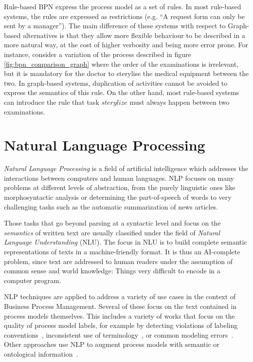 Rule-based BPN express the process model as a set of rules. In most rule-based
systems, the rules are expressed as restrictions (e.g. ``A request form can only
be sent by a manager''). The main difference of these systems with respect to
Graph-based alternatives is that they allow more flexible behaviour to be
described in a more natural way, at the cost of higher verbosity and being more
error prone. For instance, consider a variation of the process described in
figure \ref{fig:bpn_comparison_graph} where the order of the examinations is
irrelevant, but it is mandatory for the doctor to sterylise the medical
equipment between the two. In graph-based systems, duplication of activities
cannot be avoided to express the semantics of this rule. On the other hand, most
rule-based systems can introduce the rule that task $sterylize$ must always
happen between two examinations.

\section{Natural Language Processing}
\label{sec:background_nlp}

\emph{Natural Language Processing} is a field of artificial intelligence which
addresses the interactions between computers and human languages. NLP focuses on
many problems at different levels of abstraction, from the purely linguistic
ones like morphosyntactic analysis or determining the part-of-speech of words
to very challenging tasks such as the automatic summarization of news articles.

Those tasks that go beyond parsing at a syntactic level and focus on the
\emph{semantics} of written text are usually classified under the field of
\emph{Natural Language Understanding} (NLU). The focus in NLU is to build
complete semantic representations of texts in a machine-friendly format. It is
thus an AI-complete\cite{22, section 1 from TFM} problem, since text are
addressed to human readers under the assumption of common sense and world
knowledge: Things very difficult to encode in a computer program. 

NLP techniques are applied to address a variety of use cases in the context of
Business Process Management. Several of these focus on the text contained in
process models themselves. This includes a variety of works that focus on the
quality of process model labels, for example by detecting violations of labeling
conventions~\cite{becker2009,leopold2013detection,vandervos1997verification},
inconsistent use of terminology~\cite{koschmider2007}, or common modeling
errors~\cite{gruhn2011detecting}. Other approaches use NLP to augment process
models with semantic or ontological
information~\cite{leopold2015towards,francescomarino2009supporting,born2007userfriendly}.

